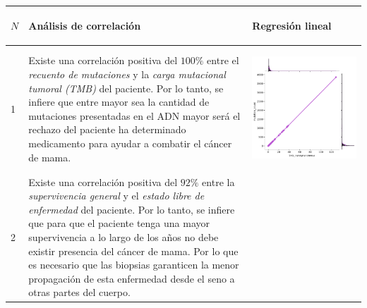 \begin{table}[htb!]
	\footnotesize
	\begin{threeparttable}
		\begin{tabular}{p{0.5cm} p{7cm} p{6.5cm}} \toprule
			\begin{center}$N$\end{center}   	 
			&\begin{center}Análisis de correlación\end{center}             
			&\begin{center}Regresión lineal\end{center}\\ \hline
			1
			& Existe una correlación positiva del $100\%$ entre el \textit{recuento de mutaciones} y la \textit{carga mutacional tumoral (TMB)} del paciente. Por lo tanto, se infiere que entre mayor sea la cantidad de mutaciones presentadas en el ADN mayor será el rechazo del paciente ha determinado medicamento para ayudar a combatir el cáncer de mama.
			
			& \begin{center}\includegraphics[width=1\linewidth]{NOTEBOOK/IMAGENES_CORRELACION/reg_tmb_nonsynonymous_mutation_count}\end{center}
			\\ \hline
			2
			& Existe una correlación positiva del $92\%$ entre la \textit{supervivencia general} y el \textit{estado libre de enfermedad} del paciente. Por lo tanto, se infiere que para que el paciente tenga una mayor supervivencia a lo largo de los años no debe existir presencia del cáncer de mama. Por lo que es necesario que las biopsias garanticen la menor propagación de esta enfermedad desde el seno a otras partes del cuerpo.
			

\end{tabular}
\end{threeparttable}
\end{table}
